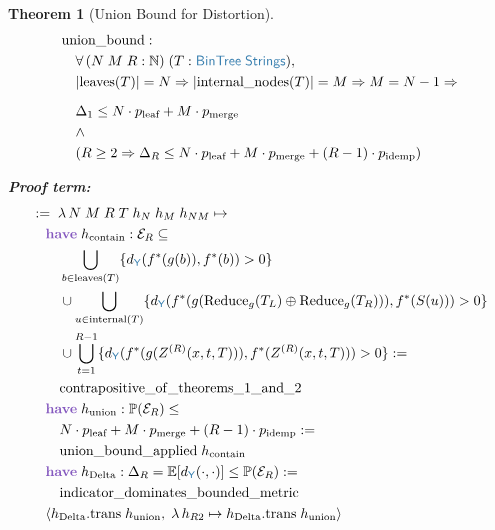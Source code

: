 \documentclass[11pt]{article}
\theoremstyle{definition}
\theoremstyle{plain}
\newtheorem{thmenv}{Theorem}
\newcommand{\kw}[1]{\textcolor{keyword}{\textbf{#1}}}
\newcommand{\ty}[1]{\textcolor{type}{\mathsf{#1}}}
\newcommand{\fn}[1]{\mathrm{#1}}
\newcommand{\lam}{\lambda\,}
\newcommand{\all}{\forall\,}
\newcommand{\Arr}{\Rightarrow}
\newcommand{\pf}{:=\;}
\newcommand{\Strings}{\ty{Strings}}
\newcommand{\Y}{\ty{Y}}
\newcommand{\N}{\mathbb{N}}
\newcommand{\fstar}{f^*}
\newcommand{\dY}{d_{\Y}}
\newcommand{\concat}{\oplus}
\newcommand{\E}{\mathbb{E}}
\newcommand{\Prob}{\mathbb{P}}
\newcommand{\reduce}{\fn{Reduce}_g}
\newcommand{\ZR}{Z^{(R)}}
\begin{document}
\begin{thmenv}[Union Bound for Distortion]
\label{thm:union}
\begin{align*}
&\fn{union\_bound} : \\
&\quad \all (N\; M\; R : \N)\; (T : \ty{BinTree}\;\Strings), \\
&\quad |\fn{leaves}(T)| = N \Arr |\fn{internal\_nodes}(T)| = M \Arr M = N - 1 \Arr \\[6pt]
&\quad \Delta_1 \leq N \cdot p_{\text{leaf}} + M \cdot p_{\text{merge}} \\
&\quad \land \\
&\quad (R \geq 2 \Arr \Delta_R \leq N \cdot p_{\text{leaf}} + M \cdot p_{\text{merge}} + (R - 1) \cdot p_{\text{idemp}})
\end{align*}

\textbf{Proof term:}
\begin{align*}
&\pf \lam N\; M\; R\; T\; h_N\; h_M\; h_{NM} \mapsto \\
&\quad \kw{have}\; h_{\text{contain}} : \mathcal{E}_R \subseteq \\
&\quad\quad \bigcup_{b \in \fn{leaves}(T)} \{\dY(\fstar(g(b)), \fstar(b)) > 0\} \\
&\quad\quad \cup \bigcup_{u \in \fn{internal}(T)} \{\dY(\fstar(g(\reduce(T_L) \concat \reduce(T_R))), \fstar(S(u))) > 0\} \\
&\quad\quad \cup \bigcup_{t=1}^{R-1} \{\dY(\fstar(g(\ZR(x, t, T))), \fstar(\ZR(x, t, T))) > 0\} := \\
&\quad\quad \fn{contrapositive\_of\_theorems\_1\_and\_2} \\
&\quad \kw{have}\; h_{\text{union}} : \Prob(\mathcal{E}_R) \leq \\
&\quad\quad N \cdot p_{\text{leaf}} + M \cdot p_{\text{merge}} + (R-1) \cdot p_{\text{idemp}} := \\
&\quad\quad \fn{union\_bound\_applied}\; h_{\text{contain}} \\
&\quad \kw{have}\; h_{\text{Delta}} : \Delta_R = \E[\dY(\cdot, \cdot)] \leq \Prob(\mathcal{E}_R) := \\
&\quad\quad \fn{indicator\_dominates\_bounded\_metric} \\
&\quad \langle h_{\text{Delta}}.\fn{trans}\; h_{\text{union}},\; \lam h_{R2} \mapsto h_{\text{Delta}}.\fn{trans}\; h_{\text{union}} \rangle
\end{align*}
\end{thmenv}

\end{document}
